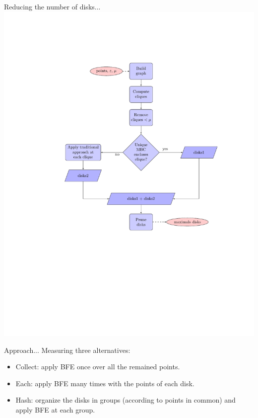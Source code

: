 \documentclass{beamer}
\begin{document}
\begin{frame}{Reducing the number of disks...}
    \centering
    \includegraphics[trim={5cm 1cm 3cm 3cm}, clip, width=0.7\textheight]{figures/flowchart}
\end{frame}


\begin{frame}{Approach...}
    Measuring three alternatives:
    \begin{itemize}
     \item Collect: apply BFE once over all the remained points.
     \item Each: apply BFE many times with the points of each disk.
     \item Hash: organize the disks in groups (according to points in common) and apply BFE at each group.
    \end{itemize}

\end{frame}
\end{document}
